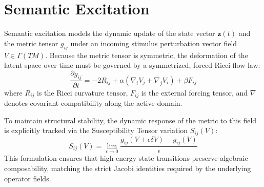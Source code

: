\section{Semantic Excitation}
\label{sec:semantic-excitation}

Semantic excitation models the
dynamic update of the state vector
$\mathbf{z}(t)$ and the metric tensor
$g_{ij}$ under an incoming stimulus
perturbation vector field $V \in \Gamma(TM)$.
Because the metric tensor is symmetric,
the deformation of the latent space
over time must be governed by a
symmetrized, forced-Ricci-flow law:
\[
\frac{\partial g_{ij}}{\partial t}
= -2 R_{ij}
+ \alpha \left( \nabla_i V_j 
+ \nabla_j V_i \right)
+ \beta F_{ij}
\]
where $R_{ij}$ is the Ricci curvature
tensor, $F_{ij}$ is the external forcing
tensor, and $\nabla$ denotes covariant 
compatibility along the active domain.

To maintain structural stability, the
dynamic response of the metric to
this field is explicitly tracked via the
Susceptibility Tensor variation $S_{ij}(V)$:
\[
S_{ij}(V) = \lim_{\epsilon \to 0} 
\frac{g_{ij}(V + \epsilon \delta V) 
- g_{ij}(V)}{\epsilon}
\]
This formulation ensures that
high-energy state transitions preserve
algebraic composability, matching the
strict Jacobi identities required by the
underlying operator fields.

